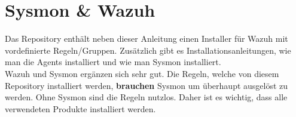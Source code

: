 \section{Sysmon \& Wazuh}
Das Repository enthält neben dieser Anleitung einen Installer für Wazuh mit vordefinierte Regeln/Gruppen.
Zusätzlich gibt es Installationsanleitungen, wie man die Agents installiert und wie man Sysmon installiert.\\

Wazuh und Sysmon ergänzen sich sehr gut.
Die Regeln, welche von diesem Repository installiert werden, \textbf{brauchen} Sysmon um überhaupt ausgelöst zu werden.
Ohne Sysmon sind die Regeln nutzlos. 
Daher ist es wichtig, dass alle verwendeten Produkte installiert werden.